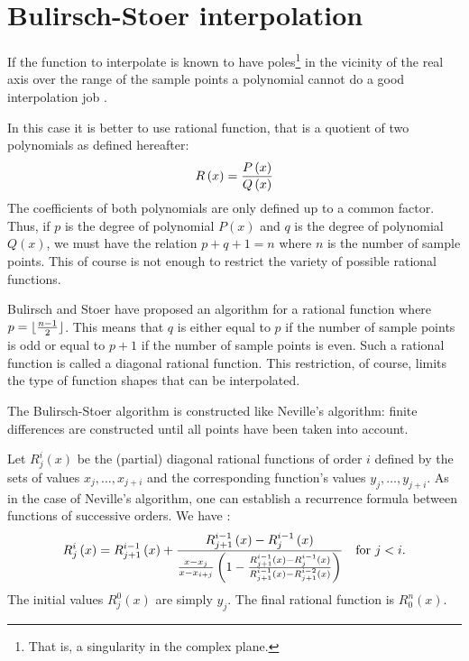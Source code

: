 \documentclass[twoside]{book}
\begin{document}
\section{Bulirsch-Stoer interpolation}
If the function to interpolate is known to have
poles\footnote{That is, a singularity in the complex plane.} in
the vicinity of the real axis over the range of the sample points
a polynomial cannot do a good interpolation job \cite{Press}.

In this case it is better to use rational function, that is a
quotient of two polynomials as defined hereafter:
\begin{equation}
R\left(x\right)={P\left(x\right)\over Q\left(x\right)}
\end{equation}
The coefficients of both polynomials are only defined up to a
common factor. Thus, if $p$ is the degree of polynomial
$P\left(x\right)$ and $q$ is the degree of polynomial
$Q\left(x\right)$, we must have the relation $p+q+1 = n$ where $n$
is the number of sample points. This of course is not enough to
restrict the variety of possible rational functions.

Bulirsch and Stoer have proposed an algorithm for a rational
function where $p=\lfloor{n-1 \over 2}\rfloor$. This means that
$q$ is either equal to $p$ if the number of sample points is odd
or equal to $p+1$ if the number of sample points is even. Such a
rational function is called a diagonal rational function. This
restriction, of course, limits the type of function shapes that
can be interpolated.

The Bulirsch-Stoer algorithm is constructed like Neville's
algorithm: finite differences are constructed until all points
have been taken into account.

Let $R_j^i\left(x\right)$ be the (partial) diagonal rational
functions of order $i$ defined by the sets of values
$x_j,\ldots,x_{j+i}$ and the corresponding function's values
$y_j,\ldots,y_{j+i}$. As in the case of Neville's algorithm, one
can establish a recurrence formula between functions of successive
orders. We have \cite{Press}:
\begin{equation}
\label{eq:bustoer}
R_j^i\left(x\right)=R_{j+1}^{i-1}\left(x\right)+
{R_{j+1}^{i-1}\left(x\right) - R_j^{i-1}\left(x\right) \over
{x-x_j\over x-x_{i+j}}\left(1-{R_{j+1}^{i-1}\left(x\right)
-R_j^{i-1}\left(x\right)\over R_{j+1}^{i-1}\left(x\right)
-R_{j+1}^{i-2}\left(x\right)}\right)}\mbox{\quad for $j<i$}.
\end{equation}
The initial values $R_j^0\left(x\right)$ are simply $y_j$. The
final rational function is $R_0^n\left(x\right)$.
\end{document}
